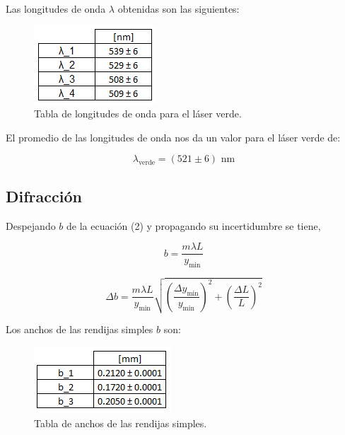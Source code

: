 \documentclass[DIV=calc, paper=a4, fontsize=10.5pt]{scrartcl}
\begin{document}
Las longitudes de onda $\lambda$ obtenidas son las siguientes:


\begin{figure}[H]
    \centering
    \includegraphics{tablas/tabla 2.PNG}
    \caption{Tabla de longitudes de onda para el láser verde.}
    \label{fig:my_label}
\end{figure}


El promedio de las longitudes de onda nos da un valor para el láser verde de:


\begin{equation*}
    \lambda_{\text{verde}} = (521 \pm 6) \text{ nm}
\end{equation*}




\subsection*{\textcolor{carmine}{Difracción}}

Despejando $b$ de la ecuación (2) y propagando su incertidumbre se tiene,

\begin{equation*}
    b = \frac{m \lambda L}{y_{\text{min}}}
\end{equation*}



\begin{equation*}
    \Delta b =\frac{m \lambda L}{y_{\text{min}}} \sqrt{\left(\frac{\Delta y_{\text{min}}}{y_{\text{min}}}\right)^{2} + \left(\frac{\Delta L}{L}\right)^{2}}
\end{equation*}

Los anchos de las rendijas simples $b$  son:

\begin{figure}[H]
    \centering
    \includegraphics{tablas/tabla 3.PNG}
    \caption{Tabla de anchos de las rendijas simples.}
    \label{fig:my_label}
\end{figure}
\end{document}
